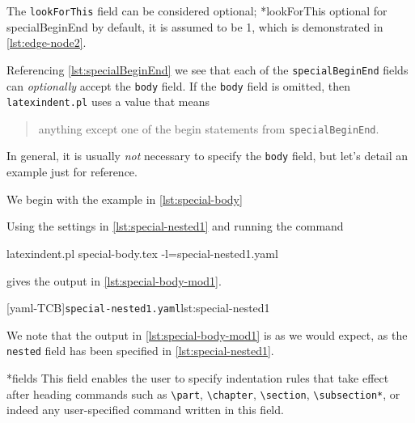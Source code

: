  The \texttt{lookForThis} field can be considered optional;
 *{lookForThis optional for specialBeginEnd} by default, it is
 assumed to be 1, which is demonstrated in \cref{lst:edge-node2}.%

 Referencing \vref{lst:specialBeginEnd} we see that  each of the \texttt{specialBeginEnd} fields can \emph{optionally} accept the
 \texttt{body} field. If the \texttt{body} field is omitted, then \texttt{latexindent.pl}
 uses a value that means
 \begin{quote}
  anything except one of the begin statements from \texttt{specialBeginEnd}.
 \end{quote}

 In general, it is usually \emph{not} necessary to specify the \texttt{body} field, but
 let's detail an example just for reference.

 \begin{example}
 We begin with the example in \cref{lst:special-body}


 Using the settings in \cref{lst:special-nested1} and running the command

 \begin{commandshell}
latexindent.pl special-body.tex -l=special-nested1.yaml
\end{commandshell}

 gives the output in \cref{lst:special-body-mod1}.

 \begin{cmhtcbraster}[ raster left skip=-3.5cm,]
  [yaml-TCB]{\texttt{special-nested1.yaml}}{lst:special-nested1}
 \end{cmhtcbraster}
 We note that the output in \cref{lst:special-body-mod1} is as we would expect, as the
 \texttt{nested} field has been specified in \cref{lst:special-nested1}.
 \end{example}

*{fields}
 This field enables the user to specify indentation rules that take effect after heading
 commands such as \lstinline!\part!, \lstinline!\chapter!, \lstinline!\section!,
 \lstinline!\subsection*!, or indeed any user-specified command written in this field.

